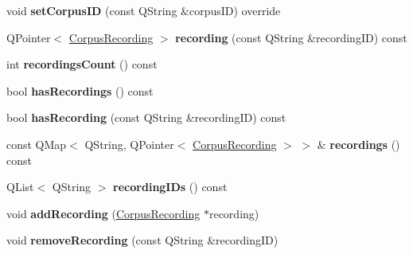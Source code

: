 \begin{DoxyCompactItemize}
\mbox{\label{class_corpus_communication_af6cbf3648e853d94efc7181cd1a4f3eb}} 
void {\bfseries set\+Corpus\+ID} (const Q\+String \&corpus\+ID) override
\item 
\mbox{\label{class_corpus_communication_a35f2afa3731d8a0af46d34c7bff6bd6a}} 
Q\+Pointer$<$ \hyperlink{class_corpus_recording}{Corpus\+Recording} $>$ {\bfseries recording} (const Q\+String \&recording\+ID) const
\item 
\mbox{\label{class_corpus_communication_a64898e8bf8c0802c40e847d54958fbe6}} 
int {\bfseries recordings\+Count} () const
\item 
\mbox{\label{class_corpus_communication_a1dc45504056a52c6dc20f3c8acc19809}} 
bool {\bfseries has\+Recordings} () const
\item 
\mbox{\label{class_corpus_communication_a7f77f4d7b4b130c31d6db5c1591230c0}} 
bool {\bfseries has\+Recording} (const Q\+String \&recording\+ID) const
\item 
\mbox{\label{class_corpus_communication_aaf2ef5dcc3594d1a24949f915cf23bfa}} 
const Q\+Map$<$ Q\+String, Q\+Pointer$<$ \hyperlink{class_corpus_recording}{Corpus\+Recording} $>$ $>$ \& {\bfseries recordings} () const
\item 
\mbox{\label{class_corpus_communication_a7b752d1babaf38bf2dc29c7ca01a1f11}} 
Q\+List$<$ Q\+String $>$ {\bfseries recording\+I\+Ds} () const
\item 
\mbox{\label{class_corpus_communication_adf43b6d6a4fce03cdd333a61346b543a}} 
void {\bfseries add\+Recording} (\hyperlink{class_corpus_recording}{Corpus\+Recording} $\ast$recording)
\item 
\mbox{\label{class_corpus_communication_ade2b822fd5a7029b05f08db3613f58be}} 
void {\bfseries remove\+Recording} (const Q\+String \&recording\+ID)
\item 
\mbox{\label{class_corpus_communication_a4af937c3102c4a609214516dd4906893}} 

\end{DoxyCompactItemize}
